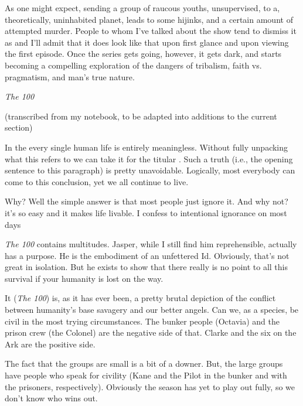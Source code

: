 \documentclass[../butidigress.tex]{subfiles}
\begin{document}
As one might expect, sending a group of raucous youths, unsupervised, to a, theoretically, uninhabited planet, leads to some hijinks, and a certain amount of attempted murder.
People to whom I've talked about the show tend to dismiss it as  and I'll admit that it does look like that upon first glance and upon viewing the first episode.
Once the series gets going, however, it gets dark, and starts becoming a compelling exploration of the dangers of tribalism, faith vs. pragmatism, and man's true nature.

\begin{somenotes}{\textit{The 100}}
    \item (transcribed from my notebook, to be adapted into additions to the current section)
    \item In the  every single human life is entirely meaningless. Without fully unpacking what  this refers to we can take it for the titular . Such a truth (i.e., the opening sentence to this paragraph) is pretty unavoidable. Logically, most everybody can come to this conclusion, yet we all continue to live.\par Why? Well the simple answer is that most people just ignore it. And why not? it's so easy and it makes life livable. I confess to intentional ignorance on most days
    \item \textit{The 100} contains multitudes. Jasper, while I still find him reprehensible, actually has a purpose. He is the embodiment of an unfettered Id. Obviously, that's not great in isolation. But he exists to show that there really is no point to all this survival if your humanity is lost on the way.
    \item It (\textit{The 100}) is, as it has ever been, a pretty brutal depiction of the conflict between humanity's base savagery and our better angels. Can we, as a species, be civil in the most trying circumstances. The bunker people (Octavia) and the prison crew (the Colonel) are the negative side of that. Clarke and the six on the Ark are the positive side.\par The fact that the  groups are small is a bit of a downer. But, the large groups have people who speak for civility (Kane and the Pilot in the bunker and with the prisoners, respectively). Obviously the season has yet to play out fully, so we don't know who wins out.
\end{somenotes}
\end{document}
